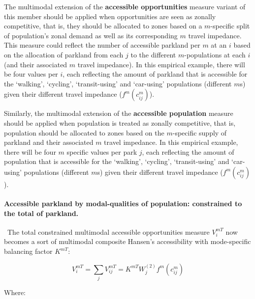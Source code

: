 \documentclass[
11pt, %
oneside, %
english, %
singlespacing, %
]{macthesis} %
\begin{document}
The multimodal extension of the \textbf{accessible opportunities} measure variant of this member should be applied when opportunities are seen as zonally competitive, that is, they should be allocated to zones based on a \(m\)-specific split of population's zonal demand as well as its corresponding \(m\) travel impedance. This measure could reflect the number of accessible parkland per \(m\) at an \(i\) based on the allocation of parkland from each \(j\) to the different \(m\)-populations at each \(i\) (and their associated \(m\) travel impedance). In this empirical example, there will be four values per \(i\), each reflecting the amount of parkland that is accessible for the `walking', `cycling', `transit-using' and `car-using' populations (different \(m\)s) given their different travel impedance (\(f^m(c^m_{ij})\)).

Similarly, the multimodal extension of the \textbf{accessible population} measure should be applied when population is treated as zonally competitive, that is, population should be allocated to zones based on the \(m\)-specific supply of parkland and their associated \(m\) travel impedance. In this empirical example, there will be four \(m\) specific values per park \(j\), each reflecting the amount of population that is accessible for the `walking', `cycling', `transit-using' and `car-using' populations (different \(m\)s) given their different travel impedance (\(f^m(c^m_{ij})\)).

\paragraph{Accessible parkland by modal-qualities of population: constrained to the total of parkland.}\label{accessible-parkland-by-modal-qualities-of-population-constrained-to-the-total-of-parkland.}

~The total constrained multimodal accessible opportunities measure \(V^{mT}_{i}\) now becomes a sort of multimodal composite Hansen's accessibility with mode-specific balancing factor \(K^{mT}\):

\begin{equation}
\label{eq:total-constrained-multimodal-access-park}
V^{mT}_{i} = \sum_j V^{mT}_{ij} = K^{mT} W_j^{(2)} f^m(c^m_{ij})
\end{equation} 

Where:
\end{document}
